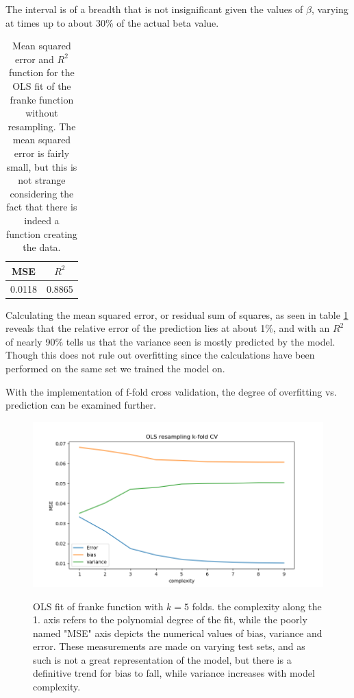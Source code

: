 \documentclass[ 12pt, a4paper ]{article}
\begin{document}
The interval is of a breadth that is not insignificant given the values of $\beta$, varying at 
times up to about 30\% of the actual beta value.

\begin{table}[H]
\centering
\begin{tabular}{ || c | c ||}
\hline
\hline
MSE & $R^2$ \\          %
\hline                  %
0.0118 & 0.8865 \\      %
\hline
\hline
\end{tabular} 
\caption{
    Mean squared error and $R^2$ function for the OLS fit of the franke function without 
    resampling. The mean squared error is fairly small, but this is not strange considering
    the fact that there is indeed a function creating the data. 
}
\label{tab:frankeolserror}
\end{table}

Calculating the mean squared error, or residual sum of squares, as seen in table 
\ref{tab:frankeolserror} reveals that the relative error of the prediction lies at about 1\%, 
and with an $R^2$ of nearly 90\% tells us that the variance seen is mostly predicted by the 
model. Though this does not rule out overfitting since the calculations have been performed on 
the same set we trained the model on. 


With the implementation of f-fold cross validation, the degree of overfitting vs. prediction can
be examined further.

\begin{figure}[H]
\includegraphics[scale=0.7]{frankeolsbiasvariance.png}
\label{fig:frankeolsbiasvariance}
\caption{
    OLS fit of franke function with $k=5$ folds. the complexity along the 1. axis refers
    to the polynomial degree of the fit, while the poorly named "MSE" axis depicts the 
    numerical values of bias, variance and error. These measurements are made on varying test
    sets, and as such is not a great representation of the model, but there is a definitive 
    trend for bias to fall, while variance increases with model complexity.
}
\end{figure}
\end{document}
